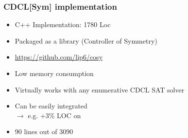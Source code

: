\documentclass{beamer}
\begin{document}
\begin{frame}
\frametitle{CDCL[Sym] implementation}
\begin{itemize}
	\item C++ Implementation:  1780 Loc
	\item Packaged as a library \textbf{\libdsb} (Controller of Symmetry)
	\item[] \url{https://github.com/lip6/cosy}
	\item Low memory consumption

	\vfill

	\item Virtually works with any enumerative CDCL SAT solver
	\item Can be easily integrated 
	\\{\color{blue}\hfill$\rightarrow$ e.g. +3\% LOC on \minisat}
	\item[]{\color{blue}\hfill 90 lines out of 3090}
\end{itemize}

\end{frame}
\end{document}
